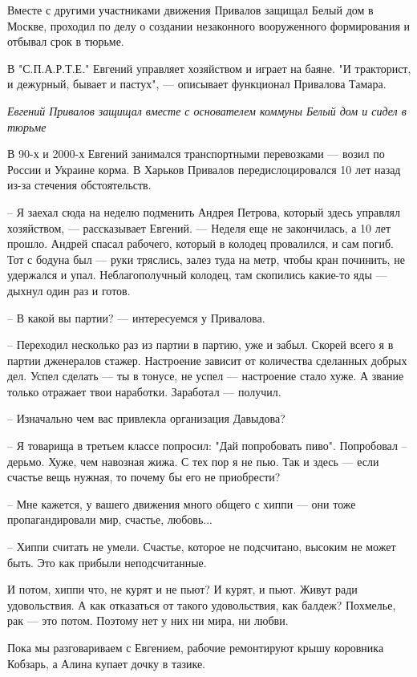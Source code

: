 Вместе с другими участниками движения Привалов защищал Белый дом в Москве,
проходил по делу о создании незаконного вооруженного формирования и отбывал
срок в тюрьме.

В "С.П.А.Р.Т.Е." Евгений управляет хозяйством и играет на баяне. "И тракторист,
и дежурный, бывает и пастух", --- описывает функционал Привалова Тамара.

\emph{Евгений Привалов защищал вместе с основателем коммуны Белый дом и сидел в
тюрьме}

В 90-х и 2000-х Евгений занимался транспортными перевозками --- возил по России и
Украине корма. В Харьков Привалов передислоцировался 10 лет назад из-за
стечения обстоятельств.

– Я заехал сюда на неделю подменить Андрея Петрова, который здесь управлял
хозяйством, --- рассказывает Евгений. --- Неделя еще не закончилась, а 10 лет
прошло. Андрей спасал рабочего, который в колодец провалился, и сам погиб. Тот
с бодуна был --- руки тряслись, залез туда на метр, чтобы кран починить, не
удержался и упал. Неблагополучный колодец, там скопились какие-то яды --- дыхнул
один раз и готов.

– В какой вы партии? --- интересуемся у Привалова.

– Переходил несколько раз из партии в партию, уже и забыл. Скорей всего я в
партии дженералов стажер. Настроение зависит от количества сделанных добрых
дел. Успел сделать --- ты в тонусе, не успел --- настроение стало хуже. А звание
только отражает твои наработки. Заработал --- получил.

– Изначально чем вас привлекла организация Давыдова?

– Я товарища в третьем классе попросил: "Дай попробовать пиво". Попробовал –
дерьмо. Хуже, чем навозная жижа. С тех пор я не пью. Так и здесь --- если счастье
вещь нужная, то почему бы его не приобрести? 

– Мне кажется, у вашего движения много общего с хиппи --- они тоже
пропагандировали мир, счастье, любовь...

– Хиппи считать не умели. Счастье, которое не подсчитано, высоким не может
быть. Это как прибыли неподсчитанные. 

И потом, хиппи что, не курят и не пьют? И курят, и пьют. Живут ради
удовольствия. А как отказаться от такого удовольствия, как балдеж? Похмелье,
рак --- это потом. Поэтому нет у них ни мира, ни любви.

Пока мы разговариваем с Евгением, рабочие ремонтируют крышу коровника Кобзарь,
а Алина купает дочку в тазике.

